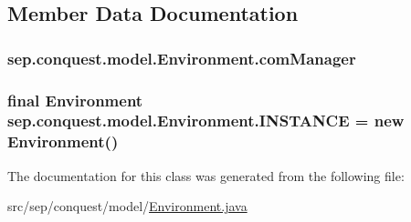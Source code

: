 \subsection{Member Data Documentation}
\hypertarget{classsep_1_1conquest_1_1model_1_1_environment_a7c3a35500c1ef418d39862f73d3b90f8}{
\subsubsection[{comManager}]{ {\bf sep.conquest.model.Environment.comManager}}}
\label{classsep_1_1conquest_1_1model_1_1_environment_a7c3a35500c1ef418d39862f73d3b90f8}
\hypertarget{classsep_1_1conquest_1_1model_1_1_environment_a217a9429ceced60597f94eb4b44b621d}{
\subsubsection[{INSTANCE}]{\setlength{\rightskip}{0pt plus 5cm}final {\bf Environment} {\bf sep.conquest.model.Environment.INSTANCE} = new {\bf Environment}()}}
\label{classsep_1_1conquest_1_1model_1_1_environment_a217a9429ceced60597f94eb4b44b621d}


The documentation for this class was generated from the following file:\begin{DoxyCompactItemize}
\item 
src/sep/conquest/model/\hyperlink{_environment_8java}{Environment.java}\end{DoxyCompactItemize}
